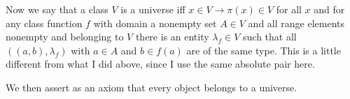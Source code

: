 \documentclass[12pt]{article}
\begin{document}
Now we say that a class $V$ is a universe iff $x \in V \rightarrow \pi(x) \in V$ for all $x$ and for any class function
$f$ with domain a nonempty set $A \in V$ and all range elements nonempty and belonging to $V$ there is an entity $\lambda_f \in V$ such that all $((a,b),\lambda_f)$ with $a \in A$ and $b \in f(a)$ are of the same type.  This is a little different from what I did above, since I use the same absolute pair here.

We then assert as an axiom that every object belongs to a universe.
\end{document}
